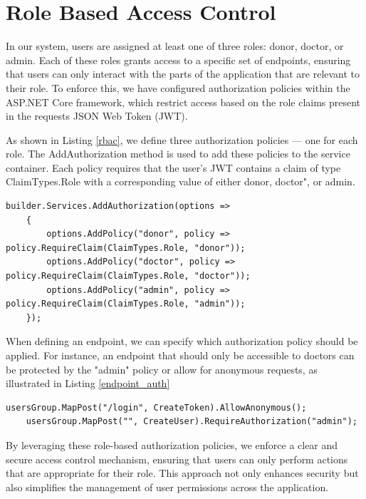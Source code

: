 \section{Role Based Access Control}
In our system, users are assigned at least one of three roles: donor, doctor, or admin. Each of these roles grants access to a specific set of endpoints, ensuring that users can only interact with the parts of the application that are relevant to their role. To enforce this, we have configured authorization policies within the ASP.NET Core framework, which restrict access based on the role claims present in the requests JSON Web Token (JWT).

As shown in Listing \ref{rbac}, we define three authorization policies — one for each role. The AddAuthorization method is used to add these policies to the service container. Each policy requires that the user’s JWT contains a claim of type ClaimTypes.Role with a corresponding value of either donor, doctor", or admin.

\begin{lstlisting}[style=sharpc, caption={Configuring Role-Based Authorization Policies in ASP.NET Core: Defining Access Control for Donor, Doctor, and Admin Roles.}, label={rbac}] 
	builder.Services.AddAuthorization(options =>
	{
		options.AddPolicy("donor", policy => policy.RequireClaim(ClaimTypes.Role, "donor"));
		options.AddPolicy("doctor", policy => policy.RequireClaim(ClaimTypes.Role, "doctor"));
		options.AddPolicy("admin", policy => policy.RequireClaim(ClaimTypes.Role, "admin"));
	});
\end{lstlisting}

When defining an endpoint, we can specify which authorization policy should be applied. For instance, an endpoint that should only be accessible to doctors can be protected by the "admin" policy or allow for anonymous requests, as illustrated in Listing \ref{endpoint_auth}

\begin{lstlisting}[style=sharpc, caption={Examples of endoint policies}, label={endpoint_auth}] 
	usersGroup.MapPost("/login", CreateToken).AllowAnonymous();
	usersGroup.MapPost("", CreateUser).RequireAuthorization("admin");
\end{lstlisting}

By leveraging these role-based authorization policies, we enforce a clear and secure access control mechanism, ensuring that users can only perform actions that are appropriate for their role. This approach not only enhances security but also simplifies the management of user permissions across the application.

